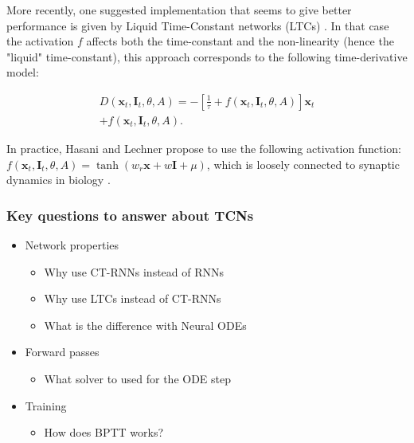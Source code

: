 More recently, one suggested implementation that seems to give better performance is given by Liquid Time-Constant networks (LTCs) \cite{Hasani2021LiquidTN}. In that case the activation $f$ affects both the time-constant and the non-linearity (hence the "liquid" time-constant), this approach corresponds to the following time-derivative model:

\begin{align}
    D(\bm{x}_t, \bm{I}_t, \theta, A) = - \left[ \frac{1}{\tau} + f(\bm{x}_t, \bm{I}_t, \theta, A) \right] \bm{x}_t \nonumber \\ + f(\bm{x}_t, \bm{I}_t, \theta, A).
\end{align}

In practice, Hasani and Lechner propose to use the following activation function: $f(\bm{x}_t, \bm{I}_t, \theta, A) = \tanh (w_r \bm{x} + w \bm{I} + \mu)$, which is loosely connected to synaptic dynamics in biology \cite{Lechner2020NeuralCP}.

\begin{table}[h!]
\centering
\caption{Time-Continuous Neural Network Classes}
\end{table}

\subsubsection{Key questions to answer about TCNs}
\begin{itemize}
    \item Network properties
    \begin{itemize}
        \item Why use CT-RNNs instead of RNNs
        \item Why use LTCs instead of CT-RNNs
        \item What is the difference with Neural ODEs
    \end{itemize}
    \item Forward passes
    \begin{itemize}
        \item What solver to used for the ODE step
    \end{itemize}
    \item Training
    \begin{itemize}
        \item How does BPTT works?
    \end{itemize}
\end{itemize}